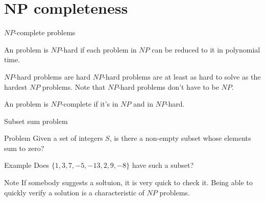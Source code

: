 
\section{NP completeness}


\begin{frame}{$NP$-complete problems}
  \begin{definition}
    An problem is $NP$-hard if each problem in $NP$ can be reduced to it in polynomial time.
  \end{definition}
  
  \vspace{0.5cm}
  {
  \begin{block}{$NP$-hard problems are hard}
  $NP$-hard problems are at least as hard to solve as the hardest $NP$ problems.
  Note that $NP$-hard problems don't have to be $NP$.
  \end{block}}
  
  \vspace{0.5cm}
  \begin{definition}
    An problem is $NP$-complete if it's in $NP$ and in $NP$-hard.
  \end{definition}
\end{frame}


\begin{frame}{Subset sum problem}
   
   {
  \begin{block}{Problem}
    Given a set of integers $S$, is there a non-empty subset whose elements sum to zero?
  \end{block}}

  \vspace{0.5cm}
  
  \begin{block}{Example}
    Does $\{ 1, 3, 7, -5, -13, 2, 9, -8 \}$ have such a subset?
  \end{block}
  
  \vspace{0.5cm}

  \begin{block}{Note}
     If somebody suggests a soltuion, it is very quick to check it.
    Being able to quickly verify a solution is a characteristic of $NP$ problems.
  \end{block}
\end{frame}


